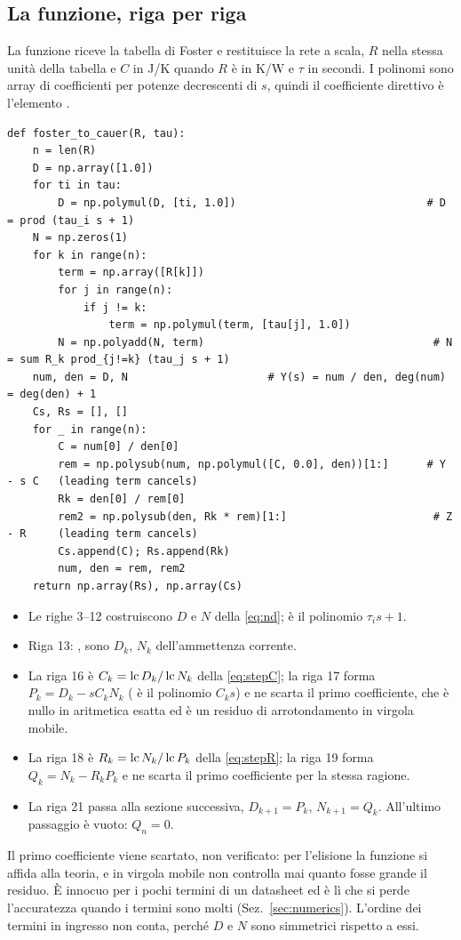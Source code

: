 \documentclass[10pt,a4paper]{scrartcl}
\let\newcommand\fcitdefine
\newcommand{\lc}{\operatorname{lc}}
\newcommand{\code}[1]{\texttt{#1}}
\begin{document}
\subsection{La funzione, riga per riga}
\label{sec:code}
La funzione riceve la tabella di Foster e restituisce la rete a scala, $R$ nella stessa unità della tabella e $C$ in J/K quando $R$ è in K/W e $\tau$ in secondi. I polinomi sono array  di coefficienti per potenze decrescenti di $s$, quindi il coefficiente direttivo è l'elemento \code{[0]}.
\begin{lstlisting}
def foster_to_cauer(R, tau):
    n = len(R)
    D = np.array([1.0])
    for ti in tau:
        D = np.polymul(D, [ti, 1.0])                              # D = prod (tau_i s + 1)
    N = np.zeros(1)
    for k in range(n):
        term = np.array([R[k]])
        for j in range(n):
            if j != k:
                term = np.polymul(term, [tau[j], 1.0])
        N = np.polyadd(N, term)                                    # N = sum R_k prod_{j!=k} (tau_j s + 1)
    num, den = D, N                      # Y(s) = num / den, deg(num) = deg(den) + 1
    Cs, Rs = [], []
    for _ in range(n):
        C = num[0] / den[0]
        rem = np.polysub(num, np.polymul([C, 0.0], den))[1:]      # Y - s C   (leading term cancels)
        Rk = den[0] / rem[0]
        rem2 = np.polysub(den, Rk * rem)[1:]                       # Z - R     (leading term cancels)
        Cs.append(C); Rs.append(Rk)
        num, den = rem, rem2
    return np.array(Rs), np.array(Cs)
\end{lstlisting}
\begin{itemize}
\item Le righe 3--12 costruiscono $D$ e $N$ della \eqref{eq:nd}; \code{[ti, 1.0]} è il polinomio $\tau_i s + 1$.
\item Riga 13: ,  sono $D_k$, $N_k$ dell'ammettenza corrente.
\item La riga 16 è $C_k = \lc D_k/\lc N_k$ della \eqref{eq:stepC}; la riga 17 forma $P_k = D_k - sC_kN_k$ (\code{[C, 0.0]} è il polinomio $C_k s$) e ne scarta il primo coefficiente, che è nullo in aritmetica esatta ed è un residuo di arrotondamento in virgola mobile.
\item La riga 18 è $R_k = \lc N_k/\lc P_k$ della \eqref{eq:stepR}; la riga 19 forma $Q_k = N_k - R_kP_k$ e ne scarta il primo coefficiente per la stessa ragione.
\item La riga 21 passa alla sezione successiva, $D_{k+1} = P_k$, $N_{k+1} = Q_k$. All'ultimo passaggio  è vuoto: $Q_n = 0$.
\end{itemize}
Il primo coefficiente viene scartato, non verificato: per l'elisione la funzione si affida alla teoria, e in virgola mobile non controlla mai quanto fosse grande il residuo. È innocuo per i pochi termini di un datasheet ed è lì che si perde l'accuratezza quando i termini sono molti (Sez.~\ref{sec:numerics}). L'ordine dei termini in ingresso non conta, perché $D$ e $N$ sono simmetrici rispetto a essi.
\end{document}

